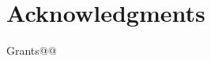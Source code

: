 \documentclass[10pt]{article}
\begin{document}







\section*{Acknowledgments}

Grants@@





\end{document}
